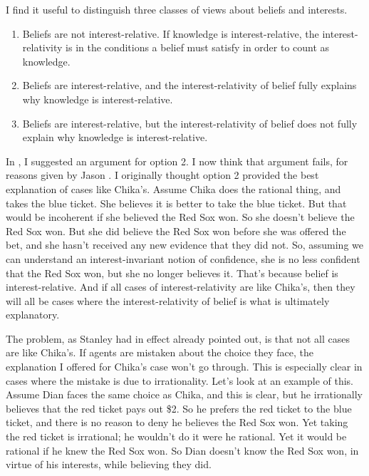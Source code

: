 \documentclass[11pt,oneside]{book}
\begin{document}
I find it useful to distinguish three classes of views about beliefs and interests.

\begin{enumerate}
\item Beliefs are not interest-relative. If knowledge is interest-relative, the interest-relativity is in the conditions a belief must satisfy in order to count as knowledge.

\item Beliefs are interest-relative, and the interest-relativity of belief fully explains why knowledge is interest-relative.

\item Beliefs are interest-relative, but the interest-relativity of belief does not fully explain why knowledge is interest-relative.

\end{enumerate}
In  \citet{Weatherson2005}, I suggested an argument for option 2. I now think that argument fails, for reasons given by Jason  \citet{Stanley2005}. I originally thought option 2 provided the best explanation of cases like Chika's. Assume Chika does the rational thing, and takes the blue ticket. She believes it is better to take the blue ticket. But that would be incoherent if she believed the Red Sox won. So she doesn't believe the Red Sox won. But she did believe the Red Sox won before she was offered the bet, and she hasn't received any new evidence that they did not. So, assuming we can understand an interest-invariant notion of confidence, she is no less confident that the Red Sox won, but she no longer believes it. That's because belief is interest-relative. And if all cases of interest-relativity are like Chika's, then they will all be cases where the interest-relativity of belief is what is ultimately explanatory.

The problem, as Stanley had in effect already pointed out, is that not all cases are like Chika's. If agents are mistaken about the choice they face, the explanation I offered for Chika's case won't go through. This is especially clear in cases where the mistake is due to irrationality. Let's look at an example of this. Assume Dian faces the same choice as Chika, and this is clear, but he irrationally believes that the red ticket pays out \$2. So he prefers the red ticket to the blue ticket, and there is no reason to deny he believes the Red Sox won. Yet taking the red ticket is irrational; he wouldn't do it were he rational. Yet it would be rational if he knew the Red Sox won. So Dian doesn't know the Red Sox won, in virtue of his interests, while believing they did.
\end{document}
